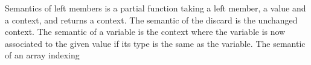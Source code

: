 \documentclass{article}
\begin{document}
\smallskip

Semantics of left members is a partial function taking a left member, a value
and a context, and returns a context.
The semantic of the discard is the unchanged context. The semantic of a variable
is the context where the variable is now associated to the given value if its
type is the same as the variable. The semantic of an array indexing 

\medskip
\end{document}
